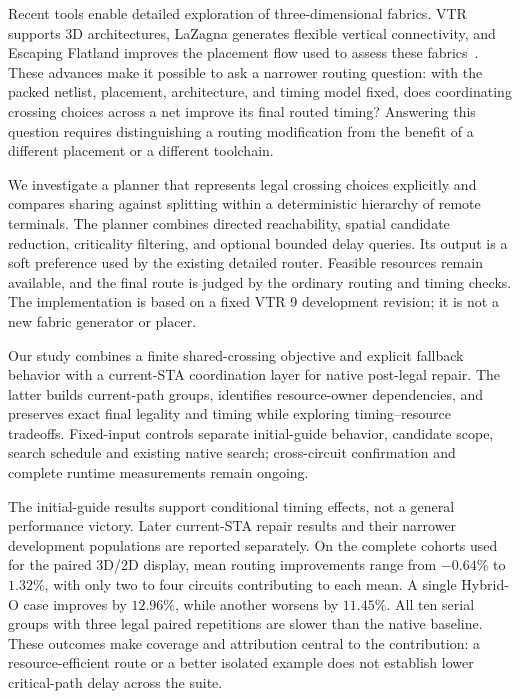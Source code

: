 \documentclass[conference,10pt]{IEEEtran}
\begin{document}
Recent tools enable detailed exploration of three-dimensional fabrics. VTR supports 3D architectures, LaZagna generates flexible vertical connectivity, and Escaping Flatland improves the placement flow used to assess these fabrics~\cite{vtr9,vtr9paper,lazagna,flatland}. These advances make it possible to ask a narrower routing question: with the packed netlist, placement, architecture, and timing model fixed, does coordinating crossing choices across a net improve its final routed timing? Answering this question requires distinguishing a routing modification from the benefit of a different placement or a different toolchain.

We investigate a planner that represents legal crossing choices explicitly and compares sharing against splitting within a deterministic hierarchy of remote terminals. The planner combines directed reachability, spatial candidate reduction, criticality filtering, and optional bounded delay queries. Its output is a soft preference used by the existing detailed router. Feasible resources remain available, and the final route is judged by the ordinary routing and timing checks. The implementation is based on a fixed VTR 9 development revision; it is not a new fabric generator or placer.

Our study combines a finite shared-crossing objective and explicit fallback behavior with a current-STA coordination layer for native post-legal repair. The latter builds current-path groups, identifies resource-owner dependencies, and preserves exact final legality and timing while exploring timing--resource tradeoffs. Fixed-input controls separate initial-guide behavior, candidate scope, search schedule and existing native search; cross-circuit confirmation and complete runtime measurements remain ongoing.

The initial-guide results support conditional timing effects, not a general performance victory. Later current-STA repair results and their narrower development populations are reported separately. On the complete cohorts used for the paired 3D/2D display, mean routing improvements range from $-0.64\%$ to $1.32\%$, with only two to four circuits contributing to each mean. A single Hybrid-O case improves by $12.96\%$, while another worsens by $11.45\%$. All ten serial groups with three legal paired repetitions are slower than the native baseline. These outcomes make coverage and attribution central to the contribution: a resource-efficient route or a better isolated example does not establish lower critical-path delay across the suite.
\end{document}
